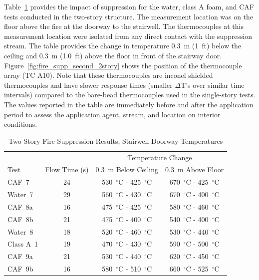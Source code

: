 \documentclass[12pt,oneside]{book}
\begin{document}
Table~\ref{tab:Test_Results_2} provides the impact of suppression for the water, class A foam, and CAF tests conducted in the two-story structure. The measurement location was on the floor above the fire at the doorway to the stairwell. The thermocouples at this measurement location were isolated from any direct contact with the suppression stream. The table provides the change in temperature 0.3~m (1~ft) below the ceiling and 0.3~m (1.0~ft) above the floor in front of the stairway door. Figure~\ref{fig:fire_supp_second_2story} shows the position of the thermocouple array (TC A10). Note that these thermocouples are inconel shielded thermocouples and have slower response times (smaller $\Delta$T's over similar time intervals) compared to the bare-bead thermocouples used in the single-story tests. The values reported in the table are immediately before and after the application period to assess the application agent, stream, and location on interior conditions.

\begin{table}[!ht]
\centering
\caption{Two-Story Fire Suppression Results, Stairwell Doorway Temperatures}\label{tab:Test_Results_2}
\begin{tabular}{lccc}
\toprule[1.5pt]
           &               & \multicolumn{2}{c}{Temperature Change}                                    \\
Test 	   & Flow Time (s) & 0.3~m Below Ceiling                 & 0.3~m Above Floor	               \\
\midrule
CAF~7      & 24            & 530~$^{\circ}$C - 425~$^{\circ}$C   & 670~$^{\circ}$C - 425~$^{\circ}$C   \\[.25cm]
Water~7    & 29            & 560~$^{\circ}$C - 430~$^{\circ}$C   & 670~$^{\circ}$C - 400~$^{\circ}$C   \\[.25cm]
CAF~8a     & 16            & 475~$^{\circ}$C - 425~$^{\circ}$C   & 580~$^{\circ}$C - 460~$^{\circ}$C   \\
CAF~8b     & 21            & 475~$^{\circ}$C - 400~$^{\circ}$C   & 540~$^{\circ}$C - 400~$^{\circ}$C   \\[.25cm]
Water~8    & 18            & 520~$^{\circ}$C - 460~$^{\circ}$C   & 530~$^{\circ}$C - 440~$^{\circ}$C   \\[.25cm]
Class A~1  & 19            & 470~$^{\circ}$C - 430~$^{\circ}$C   & 590~$^{\circ}$C - 500~$^{\circ}$C   \\
CAF~9a     & 21            & 530~$^{\circ}$C - 440~$^{\circ}$C   & 620~$^{\circ}$C - 450~$^{\circ}$C   \\
CAF~9b     & 16            & 580~$^{\circ}$C - 510~$^{\circ}$C   & 660~$^{\circ}$C - 525~$^{\circ}$C   \\
\bottomrule[1.25pt]
\end{tabular}\par
\end{table}
\end{document}
